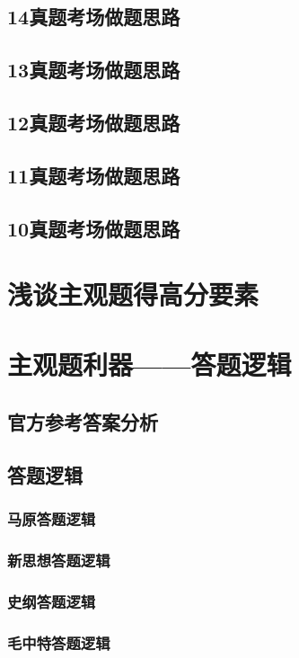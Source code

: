 \documentclass[lang=cn,newtx,10pt,scheme=chinese,pad,twocol]{zznote}
\begin{document}
\section{14真题考场做题思路}
\section{13真题考场做题思路}
\section{12真题考场做题思路}
\section{11真题考场做题思路}
\section{10真题考场做题思路}

\chapter{浅谈主观题得高分要素}





\chapter{主观题利器——答题逻辑}

\section{官方参考答案分析}



\section{答题逻辑}

\subsection{马原答题逻辑}
\subsection{新思想答题逻辑}
\subsection{史纲答题逻辑}
\subsection{毛中特答题逻辑}
\end{document}
